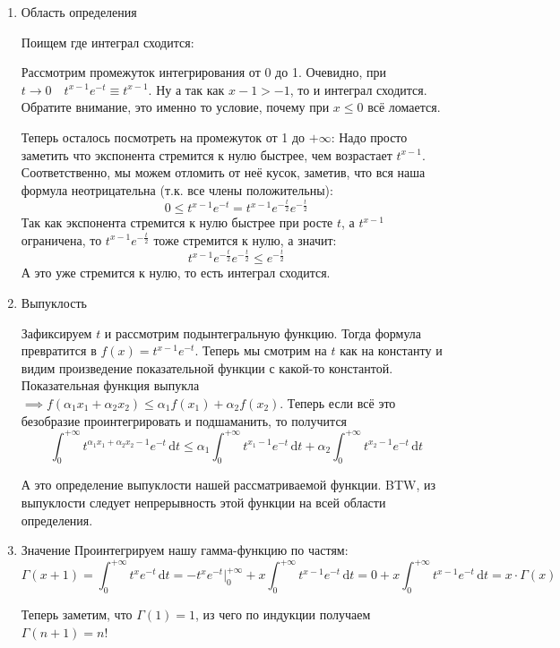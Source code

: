\documentclass{article}
\def\D{\,\mathrm{d}}
\begin{document}
\begin{enumerate}
    \item Область определения
    
    Поищем где интеграл сходится:
    
    Рассмотрим промежуток интегрирования от 0 до 1. Очевидно, при $t\rightarrow 0 \quad t^{x-1} e^{-t} \equiv t^{x-1}$. Ну а так как $x-1 > -1$, то и интеграл сходится. Обратите внимание, это именно то условие, почему при $x \le 0$ всё ломается.
    
    Теперь осталось посмотреть на промежуток от 1 до $+\infty$:
    Надо просто заметить что экспонента стремится к нулю быстрее, чем возрастает $t^{x-1}$. Соответственно, мы можем отломить от неё кусок, заметив, что вся наша формула неотрицательна (т.к. все члены положительны):
    $$
    0 \le t^{x-1} e^{-t} = t^{x-1} e^{-\frac t2} e^{-\frac t2}
    $$
    Так как экспонента стремится к нулю быстрее при росте $t$, а $t^{x-1}$ ограничена, то $t^{x-1} e^{-\frac t2}$ тоже стремится к нулю, а значит:
    $$
    t^{x-1} e^{-\frac t2} e^{-\frac t2} \le e^{-\frac t2}
    $$
    А это уже стремится к нулю, то есть интеграл сходится.
    
    
    \item Выпуклость
    
    Зафиксируем $t$ и рассмотрим подынтегральную функцию. Тогда формула превратится в $f(x) = t^{x-1}e^{-t}$. Теперь мы смотрим на $t$ как на константу и видим произведение показательной функции с какой-то константой. Показательная функция выпукла $\implies f(\alpha_1 x_1 + \alpha_2 x_2) \le \alpha_1 f(x_1) + \alpha_2 f(x_2)$. Теперь если всё это безобразие проинтегрировать и подшаманить, то получится $$
    \int^{+\infty}_0 t^{\alpha_1 x_1 + \alpha_2 x_2 -1} e^{-t} \D t \le \alpha_1 \int^{+\infty}_0 t^{x_1-1} e^{-t} \D t + \alpha_2 \int^{+\infty}_0 t^{x_2-1} e^{-t} \D t
    $$
    
    А это определение выпуклости нашей рассматриваемой функции. BTW, из выпуклости следует непрерывность этой функции на всей области определения.
    
    \item Значение
    Проинтегрируем нашу гамма-функцию по частям:
    $$
    \Gamma(x+1) = \int^{+\infty}_0 t^{x} e^{-t} \D t = -t^x e^{-t} |^{+\infty}_0 + x\int^{+\infty}_0 t^{x-1} e^{-t} \D t = 0 + x\int^{+\infty}_0 t^{x-1} e^{-t} \D t = x\cdot \Gamma(x)
    $$
    
    Теперь заметим, что $\Gamma(1) = 1$, из чего по индукции получаем $\Gamma(n+1) = n!$
    

\end{enumerate}
\end{document}

